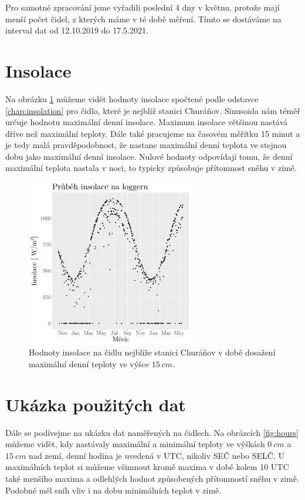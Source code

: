 Pro samotné zpracování jsme vyřadili poslední 4 dny v květnu, protože mají menší počet čidel, z kterých máme v té době měření. Tímto se dostáváme na interval dat od 12.10.2019 do 17.5.2021.

\section{Insolace}
Na obrázku \ref{fig:insolacelogger} můžeme vidět hodnoty insolace spočtené podle odstavce \ref{chap:insolation} pro čidlo, které je nejblíž stanici Churáňov. Sinusoida nám téměř určuje hodnotu maximální denní insolace. Maximum insolace většinou nastává dříve než maximální teploty. Dále také pracujeme na časovém měřítku 15 minut a je tedy malá pravděpodobnost, že nastane maximální denní teplota ve stejnou dobu jako maximální denní insolace. Nulové hodnoty odpovídají tomu, že denní maximální teplota nastala v noci, to typicky způsobuje přítomnost sněhu v zimě.

\begin{figure}
	\centering
	\includegraphics[width=0.65\textwidth]{img/ch2/insolation_max15cmNPS_4311_D_TMS.png}
	\caption{Hodnoty insolace na čidlu nejblíže stanici Churáňov v době dosažení maximální denní teploty ve výšce $\SI{15}{cm}$.}
	\label{fig:insolacelogger}
\end{figure}

\section{Ukázka použitých dat}\label{chap:showingoffdata}
Dále se podívejme na ukázku dat naměřených na čidlech. Na obrázcích \ref{fig:hours} můžeme vidět, kdy nastávaly maximální a minimální teploty ve výškách $\SI{0}{cm}$ a $\SI{15}{cm}$ nad zemí, denní hodina je uvedená v UTC, nikoliv SEČ nebo SELČ. U maximálních teplot si můžeme všimnout kromě maxima v době kolem 10 UTC také menšího maxima a odlehlých hodnot způsobených přítomností sněhu v zimě. Podobně měl sníh vliv i na dobu minimálních teplot v zimě.

